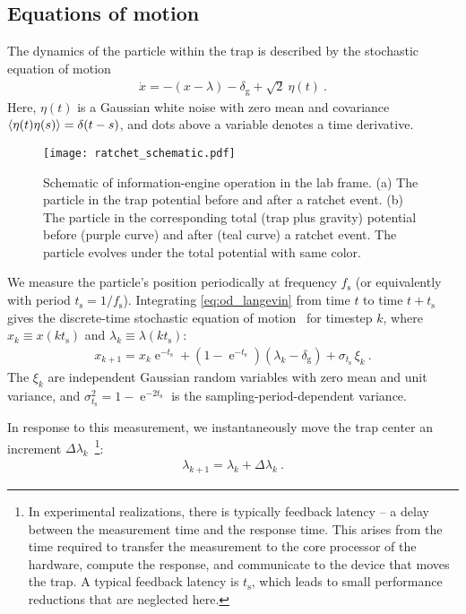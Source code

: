 \documentclass[%
reprint,
bibnotes, amsmath, amssymb, aps, pre,
 showkeys,
floatfix
]{revtex4-2}
\newcommand{\mrm}{\mathrm}
\newcommand{\pr}[1]{\left(#1\right)} %
\newcommand{\dg}{\delta_{\mrm{g}}}
\newcommand{\ts}{t_{\mrm{s}}}
\newcommand{\fs}{f_{\mrm{s}}}
\newcommand{\dlk}{\Delta\lambda_{k}}
\newcommand{\xk}{x_{k}}
\newcommand{\xkp}{x_{k+1}}
\newcommand{\lk}{\lambda_{k}}
\newcommand{\lkp}{\lambda_{k+1}}
\DeclareMathOperator{\e}{e}
\begin{document}
\subsection{Equations of motion}
\label{subsec:equations_of_motion}
The dynamics of the particle within the trap is described by the stochastic equation of motion
\begin{align}
    \dot{x} = -\pr{x-\lambda} - \dg + \sqrt{2}\ \eta(t)\ .\label{eq:od_langevin}
\end{align}
Here, $\eta(t)$ is a Gaussian white noise with zero mean and covariance $\ev{\eta(t)\eta(s)} = \delta(t-s)$, and dots above a variable denotes a time derivative.

\begin{figure}[htbp]
    \centering
    \texttt{[image: ratchet\_schematic.pdf]}
    \caption{
        Schematic of information-engine operation in the lab frame.
        (a) The particle in the trap potential before and after a ratchet event. 
        (b) The particle in the corresponding total (trap plus gravity) potential before (purple curve) and after (teal curve) a ratchet event.
        The particle evolves under the total potential with same color.
        }
    \label{fig:lab_ratchet_schematic}
\end{figure}

We measure the particle's position periodically at frequency $\fs$ (or equivalently with period $\ts = 1/\fs$). 
Integrating \eqref{eq:od_langevin} from time $t$ to time $t+\ts$ gives the discrete-time stochastic equation of motion~\cite[Ch.~4.5.4]{gardiner_book2009} for timestep $k$, where $x_{k} \equiv x(k\ts)$ and $\lk \equiv \lambda\pr{k\ts}$:
\begin{align}
    \xkp = \xk\e^{-\ts} + \pr{1-\e^{-\ts}}\pr{\lk-\dg} + \sigma_{\ts}\, \xi_{k}\ . \label{eq:discrete_od_langevin}
\end{align}
The $\xi_{k}$ are independent Gaussian random variables with zero mean and unit variance, and $\sigma_{\ts}^{2} = 1-\e^{-2\ts}$ is the sampling-period-dependent variance.  

In response to this measurement, we instantaneously move the trap center an increment $\dlk$~\footnote{In experimental realizations, there is typically feedback latency -- a delay between the measurement time and the response time. 
This arises from the time required to transfer the measurement to the core processor of the hardware, compute the response, and communicate to the device that moves the trap. A typical feedback latency is $\ts$, which leads to small performance reductions that are neglected here.}:
\begin{align}
    \lkp = \lk + \dlk\ . \label{eq:trap_update}
\end{align}
\end{document}
